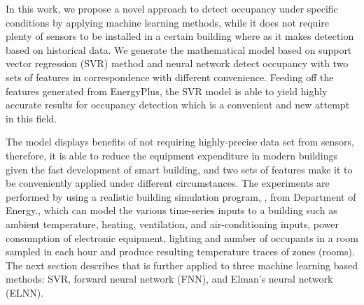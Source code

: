 
In this work, we propose a novel approach to detect occupancy under
specific conditions by applying machine learning methods, while it
does not require plenty of sensors to be installed in a certain
building where as it makes detection based on historical data. We
generate the mathematical model based on support vector regression
(SVR) method and neural network detect occupancy with two sets of
features in correspondence with different convenience. Feeding off the
features generated from EnergyPlus, the SVR model is able to yield
highly accurate results for occupancy detection which is a convenient
and new attempt in this field. 

The model displays benefits of not requiring highly-precise data set
from sensors, therefore, it is able to reduce the equipment
expenditure in modern buildings given the fast development of smart
building, and two sets of features make it to be conveniently applied
under different circumstances. The experiments are performed by using
a realistic building simulation program, \EP{}, from Department of
Energy., which can model the various time-series inputs to a building
such as ambient temperature, heating, ventilation, and
air-conditioning inputs, power consumption of electronic equipment,
lighting and number of occupants in a room sampled in each hour and
produce resulting temperature traces of zones (rooms). The next
section describes \EP{} that is further applied to three machine
learning based methods: SVR, forward neural network (FNN), and Elman's
neural network (ELNN).


